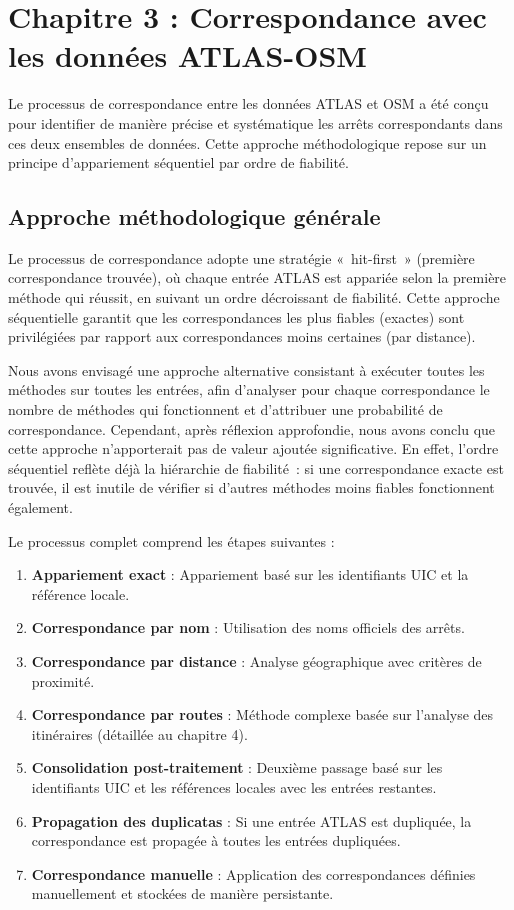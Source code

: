 \chapter{Chapitre 3 : Correspondance avec les données ATLAS-OSM}

Le processus de correspondance entre les données ATLAS et OSM a été conçu pour identifier de manière précise et systématique les arrêts correspondants dans ces deux ensembles de données. Cette approche méthodologique repose sur un principe d'appariement séquentiel par ordre de fiabilité.

\section{Approche méthodologique générale}

Le processus de correspondance adopte une stratégie «\ hit-first\ » (première correspondance trouvée), où chaque entrée ATLAS est appariée selon la première méthode qui réussit, en suivant un ordre décroissant de fiabilité. Cette approche séquentielle garantit que les correspondances les plus fiables (exactes) sont privilégiées par rapport aux correspondances moins certaines (par distance).

Nous avons envisagé une approche alternative consistant à exécuter toutes les méthodes sur toutes les entrées, afin d'analyser pour chaque correspondance le nombre de méthodes qui fonctionnent et d'attribuer une probabilité de correspondance. Cependant, après réflexion approfondie, nous avons conclu que cette approche n'apporterait pas de valeur ajoutée significative. En effet, l'ordre séquentiel reflète déjà la hiérarchie de fiabilité : si une correspondance exacte est trouvée, il est inutile de vérifier si d'autres méthodes moins fiables fonctionnent également.

Le processus complet comprend les étapes suivantes :
\begin{enumerate}
    \item \textbf{Appariement exact} : Appariement basé sur les identifiants UIC et la référence locale.
    \item \textbf{Correspondance par nom} : Utilisation des noms officiels des arrêts.
    \item \textbf{Correspondance par distance} : Analyse géographique avec critères de proximité.
    \item \textbf{Correspondance par routes} : Méthode complexe basée sur l'analyse des itinéraires (détaillée au chapitre 4).
    \item \textbf{Consolidation post-traitement} : Deuxième passage basé sur les identifiants UIC et les références locales avec les entrées restantes.
    \item \textbf{Propagation des duplicatas} : Si une entrée ATLAS est dupliquée, la correspondance est propagée à toutes les entrées dupliquées.
    \item \textbf{Correspondance manuelle} : Application des correspondances définies manuellement et stockées de manière persistante.
\end{enumerate}

